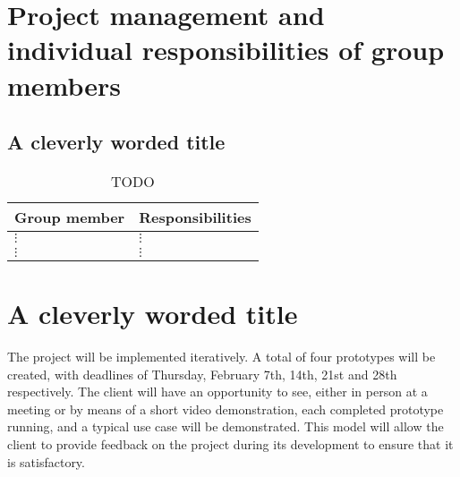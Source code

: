 \documentclass[12pt,a4paper,twoside]{article}
\begin{document}
\section{Project management and individual responsibilities of group members}
\subsection{A cleverly worded title}

\begin{table}[H]
\begin{tabular}{|l|l|}
\hline
Group member&Responsibilities\\
\hline
$\vdots$&$\vdots$\\
\hline
$\vdots$&$\vdots$\\
\hline
\end{tabular}
\caption{TODO}
\end{table}

\section{A cleverly worded title}
The project will be implemented iteratively.
A total of four prototypes will be created, with deadlines of Thursday, February 7th, 14th, 21st and 28th respectively.
The client will have an opportunity to see, either in person at a meeting or by means of a short video demonstration, each completed prototype running, and a typical use case will be demonstrated.
This model will allow the client to provide feedback on the project during its development to ensure that it is satisfactory.
\end{document}
